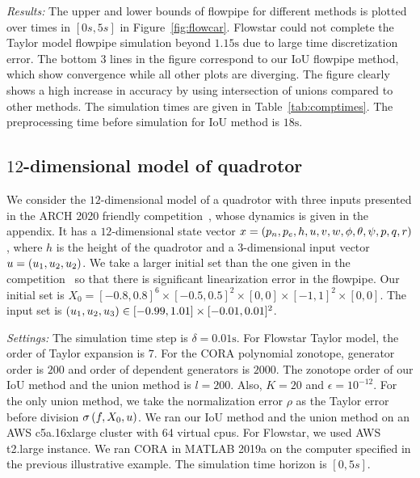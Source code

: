 \emph{Results:}  The upper and lower bounds of flowpipe for different
  methods is plotted over times in $[0 s,5 s]$ in
  Figure~\ref{fig:flowcar}.  
  Flowstar could not complete the Taylor
  model flowpipe simulation beyond $1.15\si{\second}$ due to large time discretization error.  
  The bottom 3 lines in the figure correspond
  to our IoU flowpipe method, which show convergence while all other
  plots are diverging.  
  The figure clearly shows a high increase in
  accuracy by using intersection of unions compared to other methods.
  The simulation times are given in Table~\ref{tab:comptimes}.  The
  preprocessing time before simulation for IoU method is $18\si{\second}$.
  
\subsection{$12$-dimensional model of quadrotor}
We consider the $12$-dimensional model of a quadrotor with three inputs
presented in the ARCH 2020 friendly
competition~\cite{geretti2020arch}, whose dynamics is given in the
appendix.  It has a $12$-dimensional state vector $x
= \left(p_n,p_e,h,u,v,w,\phi,\theta,\psi,p,q,r\right)$, where $h$ is the
height of the quadrotor and a $3$-dimensional input vector $u
= \left(u_1,u_2,u_2\right)$.  We take a larger initial set than the one
given in the competition~\cite{geretti2020arch} so that there is significant
linearization error in the flowpipe.  Our initial set is $X_0 =
[-0.8,0.8]^6\times[-0.5,0.5]^2\times[0,0]\times [-1,1]^2\times[0,0]$.
The input set is $\left(u_1,u_2,u_3\right)\in
[-0.99,1.01]\times[-0.01,0.01]^2$.

\emph{Settings:}  The simulation time step is $\delta = 0.01\si{\second}$.  
For Flowstar Taylor model, the order of Taylor expansion is $7$.  For
  the CORA polynomial zonotope, generator order is $200$ and order of
  dependent generators is $2000$.  The zonotope order of our IoU
  method and the union method is $l=200$.  Also, $K = 20$ and
  $\epsilon = 10^{-12}$.  For the only union method, we take the
  normalization error $\rho$ as the Taylor error before division
  $\sigma\left(f,X_0,u\right)$.  We ran our IoU method and the union method on
  an AWS c5a.16xlarge cluster with 64 virtual cpus.  For Flowstar, we
  used AWS t2.large instance.  We ran CORA in MATLAB 2019a on the
  computer specified in the previous illustrative example.  The
  simulation time horizon is $[0, 5 s]$.
  

